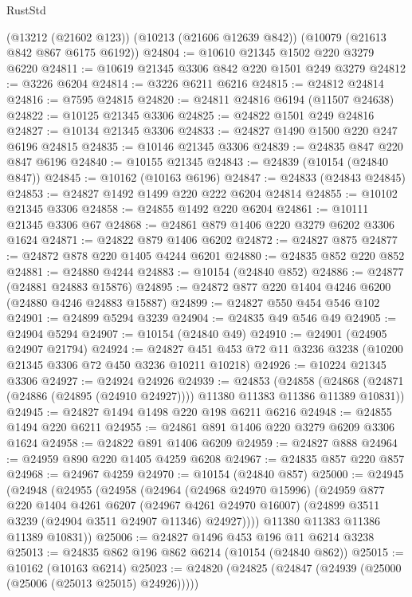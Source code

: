 \begin{lexlean}{RustStd}
\begin{coremodule}
{\begin{coremodule}
{{{{{{{{{{{{{{{{{{{{{{{{{{    (@13212 (@21602 @123))
    (@10213 (@21606 @12639 @842))
    (@10079 (@21613 @842 @867 @6175 @6192))
@24804 := @10610 @21345 @1502 @220 @3279 @6220
@24811 := @10619 @21345 @3306 @842 @220 @1501 @249 @3279
@24812 := @3226 @6204
@24814 := @3226 @6211 @6216
@24815 := @24812 @24814
@24816 := @7595 @24815
@24820 := @24811 @24816 @6194 (@11507 @24638)
@24822 := @10125 @21345 @3306
@24825 := @24822 @1501 @249 @24816
@24827 := @10134 @21345 @3306
@24833 := @24827 @1490 @1500 @220 @247 @6196 @24815
@24835 := @10146 @21345 @3306
@24839 := @24835 @847 @220 @847 @6196
@24840 := @10155 @21345
@24843 := @24839 (@10154 (@24840 @847))
@24845 := @10162 (@10163 @6196)
@24847 := @24833 (@24843 @24845)
@24853 := @24827 @1492 @1499 @220 @222 @6204 @24814
@24855 := @10102 @21345 @3306
@24858 := @24855 @1492 @220 @6204
@24861 := @10111 @21345 @3306 @67
@24868 := @24861 @879 @1406 @220 @3279 @6202 @3306 @1624
@24871 := @24822 @879 @1406 @6202
@24872 := @24827 @875
@24877 := @24872 @878 @220 @1405 @4244 @6201
@24880 := @24835 @852 @220 @852
@24881 := @24880 @4244
@24883 := @10154 (@24840 @852)
@24886 := @24877 (@24881 @24883 @15876)
@24895 := @24872 @877 @220 @1404 @4246 @6200 (@24880 @4246 @24883 @15887)
@24899 := @24827 @550 @454 @546 @102
@24901 := @24899 @5294 @3239
@24904 := @24835 @49 @546 @49
@24905 := @24904 @5294
@24907 := @10154 (@24840 @49)
@24910 := @24901 (@24905 @24907 @21794)
@24924 := @24827 @451 @453 @72 @11 @3236 @3238 (@10200 @21345 @3306 @72 @450 @3236 @10211 @10218)
@24926 := @10224 @21345 @3306
@24927 := @24924 @24926
@24939 := @24853
    (@24858 (@24868 (@24871 (@24886 (@24895 (@24910 @24927)))) @11380 @11383 @11386 @11389 @10831))
@24945 := @24827 @1494 @1498 @220 @198 @6211 @6216
@24948 := @24855 @1494 @220 @6211
@24955 := @24861 @891 @1406 @220 @3279 @6209 @3306 @1624
@24958 := @24822 @891 @1406 @6209
@24959 := @24827 @888
@24964 := @24959 @890 @220 @1405 @4259 @6208
@24967 := @24835 @857 @220 @857
@24968 := @24967 @4259
@24970 := @10154 (@24840 @857)
@25000 := @24945
    (@24948
      (@24955
        (@24958
          (@24964
            (@24968 @24970 @15996)
            (@24959
              @877
              @220
              @1404
              @4261
              @6207
              (@24967 @4261 @24970 @16007)
              (@24899 @3511 @3239 (@24904 @3511 @24907 @11346) @24927))))
        @11380
        @11383
        @11386
        @11389
        @10831))
@25006 := @24827 @1496 @453 @196 @11 @6214 @3238
@25013 := @24835 @862 @196 @862 @6214 (@10154 (@24840 @862))
@25015 := @10162 (@10163 @6214)
@25023 := @24820 (@24825 (@24847 (@24939 (@25000 (@25006 (@25013 @25015) @24926)))))
}}}}}}}}}}}}}}}}}}}}}}}}}}
\end{coremodule}}
\end{coremodule}
\end{lexlean}
